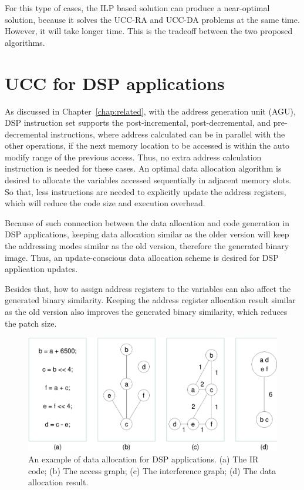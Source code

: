 For this type of cases, the ILP based solution can produce a near-optimal solution, 
because it solves the UCC-RA and UCC-DA problems at the same time. However, it will
take longer time. This is the tradeoff between the two proposed algorithms.

\section{UCC for DSP applications}

As discussed in Chapter~\ref{chap:related}, with the address generation unit (AGU), DSP instruction set supports the post-incremental, post-decremental, and pre-decremental instructions,  where address calculated can be in parallel with the other operations,
if the next memory location to be accessed is within the auto modify range of the previous access.
Thus, no extra address calculation instruction is needed for these cases.
An optimal data allocation algorithm is desired to allocate the variables accessed sequentially in adjacent memory slots. So that, less instructions are needed to explicitly update the address registers, which will reduce the code size and execution overhead.

Because of such connection between the data allocation and code generation in DSP applications, keeping data allocation similar as the older version will keep the addressing modes similar as the old version,
therefore the generated binary image. Thus, an update-conscious data allocation scheme is desired for DSP application updates.

Besides that, how to assign address registers to the variables can also affect the generated binary similarity.
Keeping the address register allocation result similar as the old version also improves the generated binary similarity, which reduces the patch size.

\begin{figure}[ht]
\begin{center}
\includegraphics[scale=0.5]{figures/csoa.eps}
\caption[An example of data allocation for DSP applications.]{An example of data allocation for DSP applications. 
(a) The IR code; 
(b) The access graph; 
(c) The interference graph; 
(d) The data allocation result.}
\label{csoa}
\end{center}
\vspace{-10mm}
\end{figure}

